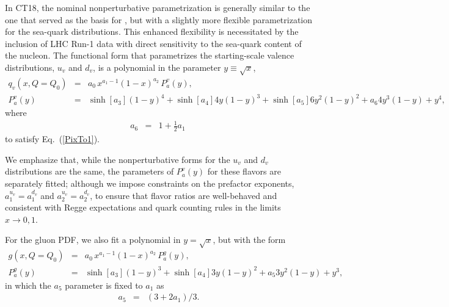 In CT18, the nominal nonperturbative parametrization is  generally similar to the one that served as the basis for \CTHERAII, but with a slightly more flexible parametrization for the sea-quark distributions. This enhanced flexibility is necessitated by the inclusion of LHC Run-1 data with direct sensitivity to the sea-quark content of the nucleon.
The functional form that parametrizes the starting-scale valence distributions, $u_v$ and $d_v$, is a polynomial in the
parameter $y\! \equiv\! \sqrt{x}$,
\begin{eqnarray}
\label{eq:v_param}
q_v(x,Q=Q_0) &=& a_0\, x^{a_1-1}(1-x)^{a_2}\,P^v_a(y), \\
P^v_a(y) &=& \sinh{[a_3]}         (1-y)^4 + 
\sinh{[a_4]}   4 y   (1-y)^3 + 
\sinh{[a_5]}   6 y^2 (1-y)^2 + 
a_6   4 y^3 (1-y)   + 
y^4,             \nonumber 
\end{eqnarray}
where 
\begin{eqnarray}
a_6 &=& 1 + \frac{1}{2} a_1\  \label{eq:a6a1}
\end{eqnarray}
 to satisfy Eq.~(\ref{PixTo1}). 

We emphasize that, while the nonperturbative forms for the
$u_v$ and $d_v$ distributions are the same, the parameters of $P^v_a(y)$ 
for these flavors are separately fitted; although we impose
constraints on the prefactor exponents, $a^{u_v}_1\! =\! a^{d_v}_1$ and
$a^{u_v}_2\! =\! a^{d_v}_2$, to ensure that flavor ratios are well-behaved
and consistent with Regge expectations and quark counting rules 
in the limits $x\! \to\! 0,1$.

For the gluon PDF, we also fit a polynomial in $y\! =\! \sqrt{x}$,
but with the form
\begin{eqnarray}
g(x,Q=Q_0) &=& a_0\, x^{a_1-1}(1-x)^{a_2}\,P^g_a(y), \\
P^g_a(y) &=& \sinh{[a_3]}         (1-y)^3 + 
\sinh{[a_4]}   3 y   (1-y)^2 + 
a_5   3 y^2 (1-y)   + 
y^3, \nonumber
\end{eqnarray}
in which the $a_5$ parameter is fixed to $a_1$ as
\begin{eqnarray}
a_5 &=& ( 3 + 2 a_1 ) \big/ 3. \label{eq:a5a3}
\end{eqnarray}

